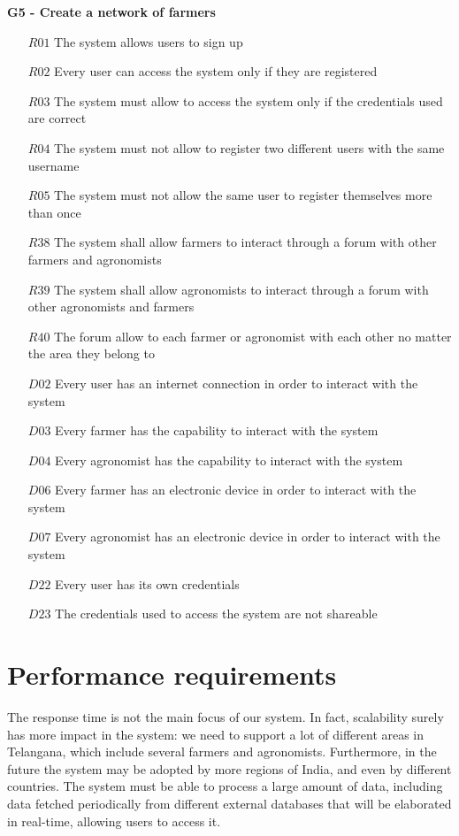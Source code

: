 \documentclass[10pt]{report}
\begin{document}
\textbf{G5 - Create a network of farmers}
\begin{itemize}
    \item [$R01$] The system allows users to sign up
    \item [$R02$] Every user can access the system only if they are registered
    \item [$R03$] The system must allow to access the system only if the credentials used are correct
    \item [$R04$] The system must not allow to register two different users with the same username
    \item [$R05$] The system must not allow the same user to register themselves more than once
    \item [$R38$] The system shall allow farmers to interact through a forum with other farmers and agronomists
    \item [$R39$] The system shall allow agronomists to interact through a forum with other agronomists and farmers
    \item [$R40$] The forum allow to each farmer or agronomist with each other no matter the area they belong to
    \item [$D02$] Every user has an internet connection in order to interact with the system
    \item [$D03$] Every farmer has the capability to interact with the system
    \item [$D04$] Every agronomist has the capability to interact with the system
    \item [$D06$] Every farmer has an electronic device in order to interact with the system
    \item [$D07$] Every agronomist has an electronic device in order to interact with the system
    \item [$D22$] Every user has its own credentials
    \item [$D23$] The credentials used to access the system are not shareable
\end{itemize}
\section{Performance requirements}
The response time is not the main focus of our system. In fact, scalability surely has more impact in the system: we need to support a lot of different areas in Telangana, which include several farmers and agronomists. Furthermore, in the future the system may be adopted by more regions of India, and even by different countries. 
The system must be able to process a large amount of data, including data fetched periodically from different external databases that will be elaborated in real-time, allowing users to access it.
\end{document}
